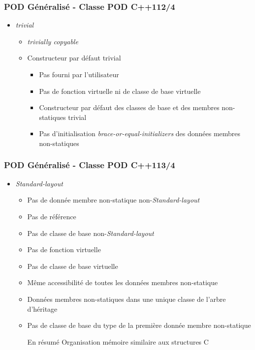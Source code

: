 \documentclass[C++.tex]{subfiles}
\begin{document}
\begin{frame}[fragile]
	\frametitle{POD Généralisé - Classe POD C++11\titlehfill{}2/4}
	\begin{itemize}
		\item \textit{trivial}
		\begin{itemize}
			\item \textit{trivially copyable}
			\item Constructeur par défaut trivial
			\begin{itemize}
				\item Pas fourni par l'utilisateur
				\item Pas de fonction virtuelle ni de classe de base virtuelle
				\item Constructeur par défaut des classes de base et des membres non-statiques trivial
				\item Pas d'initialisation \textit{brace-or-equal-initializers} des données membres non-statiques
			\end{itemize}
		\end{itemize}
	\end{itemize}
\end{frame}

\begin{frame}[fragile]
	\frametitle{POD Généralisé - Classe POD C++11\titlehfill{}3/4}
	\begin{itemize}
		\item \textit{Standard-layout}
		\begin{itemize}
			\item Pas de donnée membre non-statique non-\textit{Standard-layout} 
			\item Pas de référence
			\item Pas de classe de base non-\textit{Standard-layout}
			\item Pas de fonction virtuelle 
			\item Pas de classe de base virtuelle
			\item Même accessibilité de toutes les données membres non-statique
			\item Données membres non-statiques dans une unique classe de l'arbre d'héritage


			\item Pas de classe de base du type de la première donnée membre non-statique

			\pause

			\begin{block}{En résumé}
				Organisation mémoire similaire aux structures C
			\end{block}
		\end{itemize}
	\end{itemize}
\end{frame}
\end{document}
